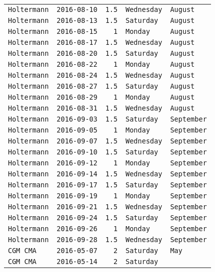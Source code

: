 \documentclass[11pt,A4paper,]{article}
\begin{document}
\begin{longtable}[]{@{}lrrll@{}}
\texttt{Holtermann} & \texttt{2016-08-10} & \texttt{1.5} &
\texttt{Wednesday} & \texttt{August}\tabularnewline
\texttt{Holtermann} & \texttt{2016-08-13} & \texttt{1.5} &
\texttt{Saturday} & \texttt{August}\tabularnewline
\texttt{Holtermann} & \texttt{2016-08-15} & \texttt{1} & \texttt{Monday}
& \texttt{August}\tabularnewline
\texttt{Holtermann} & \texttt{2016-08-17} & \texttt{1.5} &
\texttt{Wednesday} & \texttt{August}\tabularnewline
\texttt{Holtermann} & \texttt{2016-08-20} & \texttt{1.5} &
\texttt{Saturday} & \texttt{August}\tabularnewline
\texttt{Holtermann} & \texttt{2016-08-22} & \texttt{1} & \texttt{Monday}
& \texttt{August}\tabularnewline
\texttt{Holtermann} & \texttt{2016-08-24} & \texttt{1.5} &
\texttt{Wednesday} & \texttt{August}\tabularnewline
\texttt{Holtermann} & \texttt{2016-08-27} & \texttt{1.5} &
\texttt{Saturday} & \texttt{August}\tabularnewline
\texttt{Holtermann} & \texttt{2016-08-29} & \texttt{1} & \texttt{Monday}
& \texttt{August}\tabularnewline
\texttt{Holtermann} & \texttt{2016-08-31} & \texttt{1.5} &
\texttt{Wednesday} & \texttt{August}\tabularnewline
\texttt{Holtermann} & \texttt{2016-09-03} & \texttt{1.5} &
\texttt{Saturday} & \texttt{September}\tabularnewline
\texttt{Holtermann} & \texttt{2016-09-05} & \texttt{1} & \texttt{Monday}
& \texttt{September}\tabularnewline
\texttt{Holtermann} & \texttt{2016-09-07} & \texttt{1.5} &
\texttt{Wednesday} & \texttt{September}\tabularnewline
\texttt{Holtermann} & \texttt{2016-09-10} & \texttt{1.5} &
\texttt{Saturday} & \texttt{September}\tabularnewline
\texttt{Holtermann} & \texttt{2016-09-12} & \texttt{1} & \texttt{Monday}
& \texttt{September}\tabularnewline
\texttt{Holtermann} & \texttt{2016-09-14} & \texttt{1.5} &
\texttt{Wednesday} & \texttt{September}\tabularnewline
\texttt{Holtermann} & \texttt{2016-09-17} & \texttt{1.5} &
\texttt{Saturday} & \texttt{September}\tabularnewline
\texttt{Holtermann} & \texttt{2016-09-19} & \texttt{1} & \texttt{Monday}
& \texttt{September}\tabularnewline
\texttt{Holtermann} & \texttt{2016-09-21} & \texttt{1.5} &
\texttt{Wednesday} & \texttt{September}\tabularnewline
\texttt{Holtermann} & \texttt{2016-09-24} & \texttt{1.5} &
\texttt{Saturday} & \texttt{September}\tabularnewline
\texttt{Holtermann} & \texttt{2016-09-26} & \texttt{1} & \texttt{Monday}
& \texttt{September}\tabularnewline
\texttt{Holtermann} & \texttt{2016-09-28} & \texttt{1.5} &
\texttt{Wednesday} & \texttt{September}\tabularnewline
\texttt{CGM\ CMA} & \texttt{2016-05-07} & \texttt{2} & \texttt{Saturday}
& \texttt{May}\tabularnewline
\texttt{CGM\ CMA} & \texttt{2016-05-14} & \texttt{2} & \texttt{Saturday}

\end{longtable}
\end{document}
